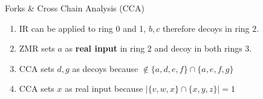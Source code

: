 \begin{columns}[t]
\begin{column}{.47\textwidth}
\begin{block}{Forks \& Cross Chain Analysis (CCA)}
    \begin{enumerate}
        \item IR can be applied to ring 0 and 1, $b,c$ therefore decoys in ring 2.
        \item ZMR sets $a$ as \textcolor{vir8}{\textbf{real input}} in ring 2 and decoy in both rings 3.
        \item CCA sets $d,g$ as decoys because  $\notin\{a,d,e,f\}\!\cap\!\{a,e,f,g\}$
        \item CCA sets $x$ as real input because $|\{v,w,x\}\!\cap\!\{x,y,z\}| = 1$
    \end{enumerate}
\end{block}


\end{column}
\end{columns}
